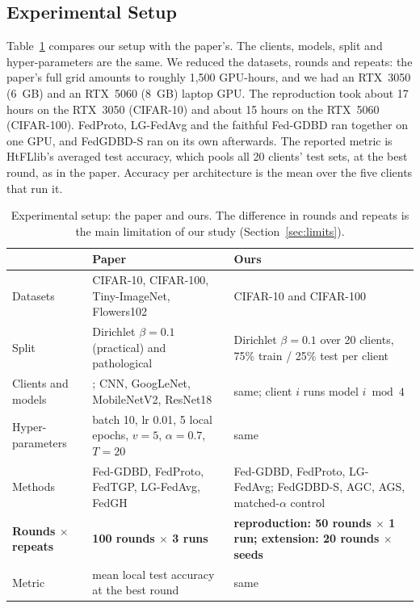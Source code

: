 \documentclass[conference]{IEEEtran}
\begin{document}
\subsection{Experimental Setup}
Table~\ref{tab:setup} compares our setup with the paper's. The clients, models, split and hyper-parameters are the same. We reduced the datasets, rounds and repeats: the paper's full grid amounts to roughly 1,500 GPU-hours, and we had an RTX~3050 (6~GB) and an RTX~5060 (8~GB) laptop GPU. The reproduction took about 17 hours on the RTX~3050 (CIFAR-10) and about 15 hours on the RTX~5060 (CIFAR-100). FedProto, LG-FedAvg and the faithful Fed-GDBD ran together on one GPU, and FedGDBD-S ran on its own afterwards. The reported metric is HtFLlib's averaged test accuracy, which pools all 20 clients' test sets, at the best round, as in the paper. Accuracy per architecture is the mean over the five clients that run it.

\begin{table}[t]
\centering
\caption{Experimental setup: the paper and ours. The difference in rounds and repeats is the main limitation of our study (Section~\ref{sec:limits}).}
\label{tab:setup}
\footnotesize
\begin{tabularx}{\textwidth}{>{\raggedright\arraybackslash}p{2.6cm}>{\raggedright\arraybackslash}X>{\raggedright\arraybackslash}X}
\toprule
 & Paper \cite{zhang2025gdbd} & Ours \\
\midrule
Datasets & CIFAR-10, CIFAR-100, Tiny-ImageNet, Flowers102 & CIFAR-10 and CIFAR-100 \cite{krizhevsky2009cifar} \\
Split & Dirichlet $\beta=0.1$ (practical) and pathological & Dirichlet $\beta=0.1$ over 20 clients, 75\% train / 25\% test per client \\
Clients and models & 20; CNN, GoogLeNet, MobileNetV2, ResNet18 & same; client $i$ runs model $i \bmod 4$ \\
Hyper-parameters & batch 10, lr 0.01, 5 local epochs, $v=5$, $\alpha=0.7$, $T=20$ & same \\
Methods & Fed-GDBD, FedProto, FedTGP, LG-FedAvg, FedGH & Fed-GDBD, FedProto, LG-FedAvg; FedGDBD-S, AGC, AGS, matched-$\alpha$ control \\
\textbf{Rounds $\times$ repeats} & \textbf{100 rounds $\times$ 3 runs} & \textbf{reproduction: 50 rounds $\times$ 1 run; extension: 20 rounds $\times$ \NSeeds{} seeds} \\
Metric & mean local test accuracy at the best round & same \\
\bottomrule
\end{tabularx}
\end{table}
\end{document}

